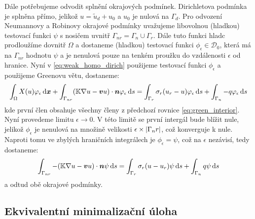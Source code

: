Dále potřebujeme odvodit splnění okrajových podmínek. Dirichletova podmínka je splněna přímo, jelikož $u=\tilde u_d + u_0$ a $u_0$ je nulová na $\Gamma_d$.
Pro odvození Neumannovy a Robinovy okrajové podmínky uvažujeme libovolnou (hladkou) testovací funkci $\psi$ s nosičem uvnitř $\Gamma_{nr} =\Gamma_n \cup \Gamma_r$. 
Dále tuto funkci hladc prodloužíme dovnitř  $\Omega$ a dostaneme  (hladkou) testovací funkci $\phi_\epsilon \in \mathcal D_0$, která má na 
$\Gamma_{nr}$ hodnotu $\psi$ a je nenulová pouze na tenkém proužku do vzdálenosti $\epsilon$ od hranice.
Nyní v \eqref{eq:weak_homo_dirich} použijeme testovací funkci $\phi_\epsilon$ a použijeme Greenovu větu, dostaneme:
\[
    \int_\Omega X(u)\varphi_\epsilon \,{\rm d} \mathbf{\boldsymbol{x}} + \int_{\Gamma_{nr}} ({\mathbb{K}}\nabla u-\mathbf{\boldsymbol{v}} u)\cdot \mathbf{\boldsymbol{n}} \varphi_\epsilon \,{\rm d} s    
              =  \int_{\Gamma_r} \sigma_r (u_r -u) \varphi_\epsilon \,{\rm d} s + \int_{\Gamma_n} -q \varphi_\epsilon \,{\rm d} s 
\]
kde první člen obsahuje všechny členy z předchozí rovnice \eqref{eq:green_interior}. Nyní provedeme limitu $\epsilon \to 0$. V této limitě se první intergál 
bude blížit nule, jelikož $\phi_\epsilon$ je nenulová na množině velikosti $\epsilon \times \lvert\Gamma_nr\rvert$, což konverguje k nule. Naproti tomu ve zbylých 
hraničních integrálech je $\phi_\epsilon = \psi$, což na $\epsilon$ nezávisí, tedy dostaneme:
\[
    \int_{\Gamma_{nr}} -({\mathbb{K}}\nabla u-\mathbf{\boldsymbol{v}} u)\cdot \mathbf{\boldsymbol{n}} \psi \,{\rm d} s  
              =  \int_{\Gamma_r} \sigma_r (u -u_r) \psi \,{\rm d} s + \int_{\Gamma_n} q \psi \,{\rm d} s 
\]
a odtud obě okrajové podmínky.


\subsection{Ekvivalentní minimalizační úloha}



